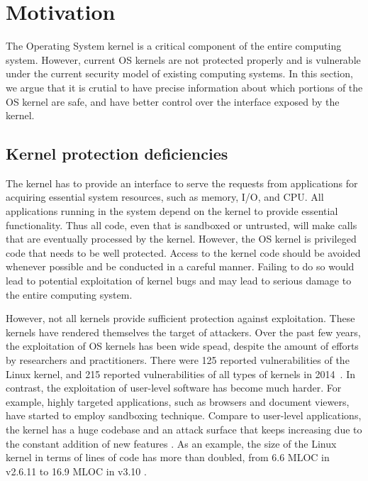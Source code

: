 \section{Motivation}
\label{sec.motivation}

The Operating System kernel is a critical component of the entire computing system. 
However, current OS kernels are not protected properly and is vulnerable under the 
current security model of existing computing systems. In this section, we argue that 
it is crutial to have precise information about which portions of the OS kernel are safe, 
and have better control over the interface exposed by the kernel.

\subsection{Kernel protection deficiencies}
The kernel has to provide an interface to serve the requests from applications for acquiring 
essential system resources, such as memory, I/O, and CPU. 
All applications running in the system depend on the kernel to provide 
essential functionality.  Thus all code, even that is 
sandboxed or untrusted, will make calls that are eventually processed by the
kernel.
%
However, the OS kernel is privileged code that needs to be well protected. Access to the
kernel code should be avoided whenever possible and be conducted in a careful manner. 
Failing to do so would lead to potential exploitation of kernel bugs and 
may lead to serious damage to the entire computing system.  

However, not all kernels provide sufficient protection against exploitation.
These kernels have rendered themselves the target of attackers. Over the past few years, 
the exploitation of OS kernels has been wide spead, 
despite the amount of efforts by researchers and practitioners. 
There were 125 reported vulnerabilities of the Linux kernel, and 215 reported vulnerabilities 
of all types of kernels in 2014~\cite{NVD:14}. In contrast, the exploitation 
of user-level software has become much harder. For example, highly 
targeted applications, such as browsers and document viewers, have 
started to employ sandboxing technique. Compare to user-level 
applications, the kernel has a huge codebase and an attack surface 
that keeps increasing due to the constant addition of 
new features \cite{Metrics:13}. As an example, the size of the Linux kernel in terms of lines of code 
has more than doubled, from 6.6 MLOC in v2.6.11 to 16.9 MLOC in v3.10 \cite{Linux:13}.

